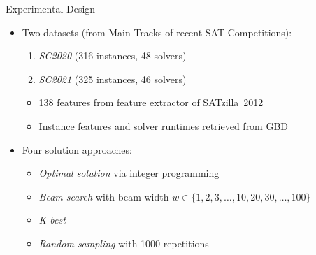 \documentclass[en]{sdqbeamer}
\begin{document}
\begin{frame}[t]{Experimental Design}
	\begin{itemize}
		\item Two datasets (from Main Tracks of recent SAT Competitions):
		\begin{enumerate}[1)]
			\item \emph{SC2020} (316 instances, 48 solvers)~\cite{balyo2020proceedings}
			\item \emph{SC2021} (325 instances, 46 solvers)~\cite{balyo2021proceedings}
		\end{enumerate}
		\begin{itemize}
			\item 138 features from feature extractor of SATzilla~2012~\cite{xu2012features, xu2012satzilla2012}
			\item Instance features and solver runtimes retrieved from GBD~\cite{iser2020collaborative}
		\end{itemize}
		\pause
		\vspace{\baselineskip}
		\item Four solution approaches:
		\begin{itemize}
			\item \emph{Optimal solution} via integer programming~\cite{python-mip}
			\item \emph{Beam search} with beam width $w \in \{1, 2, 3, \dots, 10, 20, 30, \dots, 100\}$
			\item \emph{K-best}
			\item \emph{Random sampling} with 1000 repetitions

\end{itemize}
\end{itemize}
\end{frame}
\end{document}
